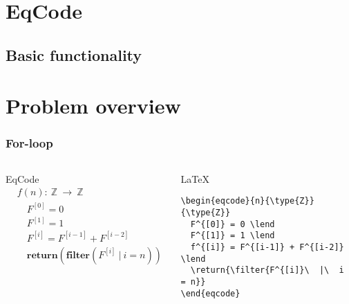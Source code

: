 \documentclass[xcolor=dvipsnames,mathserif,professionalfont,12pt]{beamer}
\begin{document}
\section{EqCode}
\subsection{Basic functionality}
\section{Problem overview}

\begin{frame}[fragile]
  \frametitle{For-loop}
  \begin{columns}[t]
    \begin{block}{EqCode}
      \begin{align*}
& f(n):\  \mathbb{Z}\  \rightarrow\  \mathbb{Z} \\
& \quad F^{[0]} = 0 \\
& \quad F^{[1]} = 1 \\
& \quad F^{[i]} = F^{[i-1]} + F^{[i-2]} \\
& \quad {\textbf {return}}({\textbf {filter}}(F^{[i]}\  |\  i = n))
      \end{align*}
    \end{block}
      \begin{block}{\LaTeX}
      \begin{lstlisting}
\begin{eqcode}{n}{\type{Z}}{\type{Z}}
  F^{[0]} = 0 \lend
  F^{[1]} = 1 \lend
  f^{[i]} = F^{[i-1]} + F^{[i-2]} \lend
  \return{\filter{F^{[i]}\  |\  i = n}}
\end{eqcode}
      \end{lstlisting}
      \end{block}
  \end{columns}
\end{frame}
\end{document}
